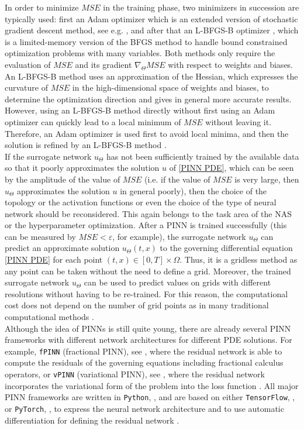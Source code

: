 In order to minimize $MSE$ in the training phase, two minimizers in succession are typically used: first an Adam optimizer which is an extended version of stochastic gradient descent method, see e.g. \cite{KingmaBa:2017}, and after that an L-BFGS-B optimizer \cite{ByrdLuNocedalZhu:1995}, which is a limited-memory version of the BFGS method to handle bound constrained optimization problems with many variables. Both methods only require the evaluation of $MSE$ and its gradient $\nabla_\Theta MSE$ with respect to weights and biases. An L-BFGS-B method uses an approximation of the Hessian, which expresses the curvature of $MSE$ in the high-dimensional space of weights and biases, to determine the optimization direction and gives in general more accurate results. However, using an L-BFGS-B method directly without first using an Adam optimizer can quickly lead to a local minimum of $MSE$ without leaving it. Therefore, an Adam optimizer is used first to avoid local minima, and then the solution is refined by an L-BFGS-B method \cite[p.~6]{Markidis:2021}. \\
If the surrogate network $u_\Theta$ has not been sufficiently trained by the available data so that it poorly approximates the solution $u$ of \cref{PINN PDE}, which can be seen by the amplitude of the value of $MSE$ (i.e. if the value of $MSE$ is very large, then $u_\Theta$ approximates the solution $u$ in general poorly), then the choice of the topology or the activation functions or even the choice of the type of neural network should be reconsidered. This again belongs to the task area of the NAS or the hyperparameter optimization. After a PINN is trained successfully (this can be measured by $MSE < \varepsilon$, for example), the surrogate network $u_\Theta$ can predict an approximate solution $u_\Theta (t,x)$ to the governing differential equation \cref{PINN PDE} for each point $(t,x) \in \left[ 0, T \right] \times \Omega$. Thus, it is a gridless method as any point can be taken without the need to define a grid. Moreover, the trained surrogate network $u_\Theta$ can be used to predict values on grids with different resolutions without having to be re-trained. For this reason, the computational cost does not depend on the number of grid points as in many traditional computational methods \cite[p.~2]{Markidis:2021}. \\
Although the idea of PINNs is still quite young, there are already several PINN frameworks with different network architectures for different PDE solutions. For example, \lstinline!fPINN! (fractional PINN), see \cite{PangLuKarniadakis:2019}, where the residual network is able to compute the residuals of the governing equations including fractional calculus operators, or \lstinline!vPINN! (variational PINN), see \cite{KharazmiZhangKarniadakis:2019}, where the residual network incorporates the variational form of the problem into the loss function \cite[pp.~5-6]{Markidis:2021}. All major PINN frameworks are written in \lstinline!Python!, \cite{Python}, and are based on either \lstinline!TensorFlow!, \cite{TensorFlow}, or \lstinline!PyTorch!, \cite{PyTorch}, to express the neural network architecture and to use automatic differentiation for defining the residual network \cite[p.~6]{Markidis:2021}. 